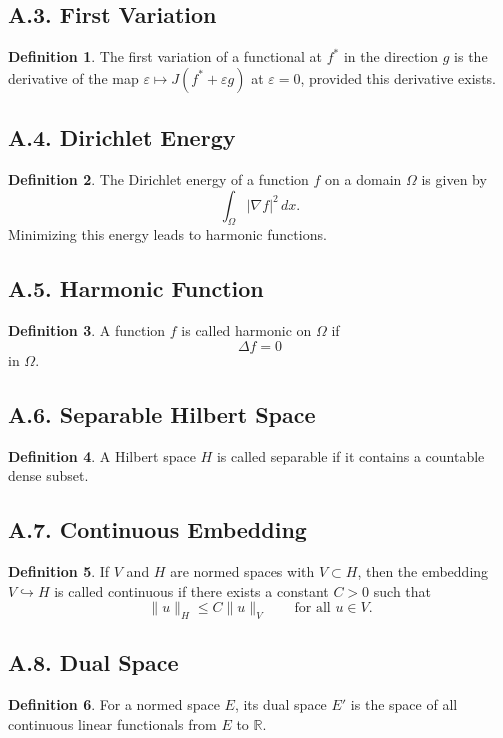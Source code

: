 \documentclass[11pt]{article}
\theoremstyle{definition}
\newtheorem{definition}{Definition}
\theoremstyle{remark}
\begin{document}
\subsection*{A.3. First Variation}
\begin{definition}
The first variation of a functional at \(f^*\) in the direction \(g\) is the derivative of the map \(\varepsilon\mapsto J(f^*+\varepsilon g)\) at \(\varepsilon=0\), provided this derivative exists.
\end{definition}

\subsection*{A.4. Dirichlet Energy}
\begin{definition}
The Dirichlet energy of a function \(f\) on a domain \(\Omega\) is given by
\[
\int_\Omega |\nabla f|^2\,dx.
\]
Minimizing this energy leads to harmonic functions.
\end{definition}

\subsection*{A.5. Harmonic Function}
\begin{definition}
A function \(f\) is called harmonic on \(\Omega\) if
\[
\Delta f=0
\]
in \(\Omega\).
\end{definition}

\subsection*{A.6. Separable Hilbert Space}
\begin{definition}
A Hilbert space \(H\) is called separable if it contains a countable dense subset.
\end{definition}

\subsection*{A.7. Continuous Embedding}
\begin{definition}
If \(V\) and \(H\) are normed spaces with \(V\subset H\), then the embedding \(V\hookrightarrow H\) is called continuous if there exists a constant \(C>0\) such that
\[
\|u\|_H\le C\|u\|_V
\qquad
\text{for all } u\in V.
\]
\end{definition}

\subsection*{A.8. Dual Space}
\begin{definition}
For a normed space \(E\), its dual space \(E'\) is the space of all continuous linear functionals from \(E\) to \(\mathbb R\).
\end{definition}
\end{document}
